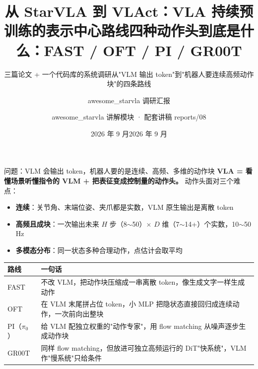 \documentclass[aspectratio=169,10pt]{beamer}
\title[awesome\_starvla]{从 StarVLA 到 VLAct：VLA 持续预训练的表示中心路线}
\subtitle{三篇论文 + 一个代码库的系统调研}
\author{awesome\_starvla 调研汇报}
\institute{github.com/asimfish/awesome\_starvla}
\date{2026 年 9 月}
\title[动作头讲解]{四种动作头到底是什么：FAST / OFT / PI / GR00T}
\subtitle{从"VLM 输出 token"到"机器人要连续高频动作块"的四条路线}
\author{awesome\_starvla 讲解模块 · 配套讲稿 reports/08}
\institute{github.com/asimfish/awesome\_starvla}
\date{2026 年 9 月}
\begin{document}
\begin{frame}
  \titlepage
\end{frame}

\begin{frame}{问题：VLM 会输出 token，机器人要的是连续、高频、多维的动作块}
  \textbf{VLA = 看懂场景听懂指令的 VLM + 把表征变成控制量的动作头。} 动作头面对三个难点：
  \begin{itemize}
    \item \textbf{连续}：关节角、末端位姿、夹爪都是实数，VLM 原生输出是离散 token
    \item \textbf{高频且成块}：一次输出未来 $H$ 步（8$\sim$50）$\times$ $D$ 维（7$\sim$14+）个实数，10$\sim$50 Hz
    \item \textbf{多模态分布}：同一状态多种合理动作，点估计会取平均
  \end{itemize}
  \vspace{4pt}
  \begin{center}\small
  \begin{tabular}{p{1.4cm}p{11.6cm}}
    \toprule
    路线 & 一句话 \\
    \midrule
    FAST & 不改 VLM，把动作块压缩成一串离散 token，像生成文字一样生成动作 \\
    OFT & 在 VLM 末尾拼占位 token，小 MLP 把隐状态直接回归成连续动作，一次前向出整块 \\
    PI（$\pi_0$） & 给 VLM 配独立权重的"动作专家"，用 flow matching 从噪声逐步生成动作块 \\
    GR00T & 同样 flow matching，但放进可独立高频运行的 DiT"快系统"，VLM 作"慢系统"只给条件 \\
    \bottomrule
  \end{tabular}
  \end{center}
\end{frame}
\end{document}
